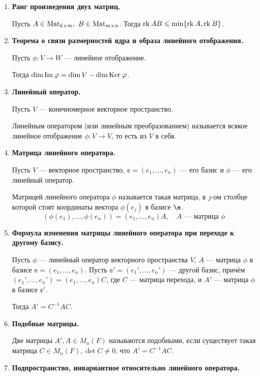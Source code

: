 \begin{enumerate}
\item \textbf{Ранг произведения двух матриц.}

Пусть $A \in \mathrm{Mat}_{k\times m},\ B\in \mathrm{Mat}_{m\times n}$. Тогда $\mathrm{rk}\: AB \leqslant \min\{\mathrm{rk}\: A, \mathrm{rk}\: B\}$.

\item \textbf{Теорема о связи размерностей ядра и образа линейного отображения.}

Пусть $\phi\colon V \rightarrow W$ --- линейное отображение.

Тогда $\dim \mathrm{Im\:} \varphi = \dim V - \dim \mathrm{Ker}\: \varphi$.

\item \textbf{Линейный оператор.}

Пусть $V$ --- конечномерное векторное пространство.

Линейным оператором (или линейным преобразованием) называется всякое линейное отображение $\phi \colon V \rightarrow V$, то есть из $V$ в себя.

\item \textbf{Матрица линейного оператора.}

Пусть $V$ --- векторное пространство, $\mathbb{e} = (e_1, \ldots, e_n)$ --- его базис и $\phi$ --- его линейный оператор.

Матрицей линейного оператора $\phi$ называется такая матрица, в $j$-ом столбце которой стоят координаты вектора $\phi(e_j)$ в базисе $\e$.
$$
\left(\phi(e_1), \ldots, \phi(e_n)\right) = \left(e_1, \ldots, e_n\right)A, \quad A \text{ --- матрица $\phi$}
$$

\item \textbf{Формула изменения матрицы линейного оператора при переходе к другому базису.}

Пусть $\phi$ --- линейный оператор векторного пространства $V$, $A$ --- матрица $\phi$ в базисе $\mathbb{e} = (e_1, \ldots, e_n)$. Пусть $\mathbb{e}' = (e_1', \ldots, e_n')$ --- другой базис, причём $(e_1', \ldots, e_n') = (e_1, \ldots, e_n)C$, где $C$ --- матрица перехода, и $A'$ --- матрица $\phi$ в базисе $\mathbb{e}'$.

Тогда $A' = C^{-1}AC$.

\item \textbf{Подобные матрицы.}

Две матрицы $A', A \in M_n(F)$ называются подобными, если существует такая матрица $C \in M_n(F), \det C \neq 0$, что $A' = C^{-1}AC$.

\item \textbf{Подпространство, инвариантное относительно линейного оператора.}


\end{enumerate}
